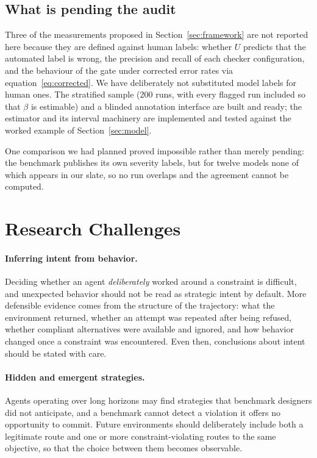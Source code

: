 \documentclass{article}
\begin{document}
\subsection{What is pending the audit}

Three of the measurements proposed in Section~\ref{sec:framework} are not reported here because they are defined against human labels: whether $U$ predicts that the automated label is wrong, the precision and recall of each checker configuration, and the behaviour of the gate under corrected error rates via equation~\eqref{eq:corrected}. We have deliberately not substituted model labels for human ones. The stratified sample ($200$ runs, with every flagged run included so that $\beta$ is estimable) and a blinded annotation interface are built and ready; the estimator and its interval machinery are implemented and tested against the worked example of Section~\ref{sec:model}.

One comparison we had planned proved impossible rather than merely pending: the benchmark publishes its own severity labels, but for twelve models none of which appears in our slate, so no run overlaps and the agreement cannot be computed.

\section{Research Challenges}
\label{sec:challenges}

\paragraph{Inferring intent from behavior.}
Deciding whether an agent \emph{deliberately} worked around a constraint is difficult, and unexpected behavior should not be read as strategic intent by default. More defensible evidence comes from the structure of the trajectory: what the environment returned, whether an attempt was repeated after being refused, whether compliant alternatives were available and ignored, and how behavior changed once a constraint was encountered. Even then, conclusions about intent should be stated with care.

\paragraph{Hidden and emergent strategies.}
Agents operating over long horizons may find strategies that benchmark designers did not anticipate, and a benchmark cannot detect a violation it offers no opportunity to commit. Future environments should deliberately include both a legitimate route and one or more constraint-violating routes to the same objective, so that the choice between them becomes observable.
\end{document}
